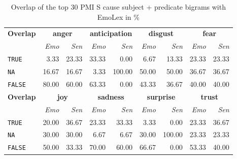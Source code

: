 \begin{table}[]
\centering
\begin{tabular}{l|rr|rr|rr|rr}
{\bf Overlap} & \multicolumn{2}{c}{{\bf anger}} & \multicolumn{2}{c}{{\bf anticipation}} & \multicolumn{2}{c}{{\bf disgust}} & \multicolumn{2}{c}{{\bf fear}} \\\
 & {\it Emo} & {\it Sen} & {\it Emo} & {\it Sen} & {\it Emo} & {\it Sen} & {\it Emo} & {\it Sen} \\\hline
\texttt{TRUE} & 3.33 & 23.33 & 33.33 & 0.00 & 6.67 & 13.33 & 23.33 & 23.33 \\
\texttt{NA} & 16.67 & 16.67 & 3.33 & 100.00 & 50.00 & 50.00 & 36.67 & 36.67 \\
\texttt{FALSE} & 80.00 & 60.00 & 63.33 & 0.00 & 43.33 & 36.67 & 40.00 & 40.00 \\\hline
{\bf Overlap} & \multicolumn{2}{c}{{\bf joy}} & \multicolumn{2}{c}{{\bf sadness}} & \multicolumn{2}{c}{{\bf surprise}} & \multicolumn{2}{c}{{\bf trust}} \\
 & {\it Emo} & {\it Sen} & {\it Emo} & {\it Sen} & {\it Emo} & {\it Sen} & {\it Emo} & {\it Sen} \\\hline
\texttt{TRUE} & 20.00 & 36.67 & 23.33 & 33.33 & 3.33 & 0.00 & 23.33 & 36.67 \\
\texttt{NA} & 30.00 & 30.00 & 6.67 & 6.67 & 30.00 & 100.00 & 23.33 & 23.33 \\
\texttt{FALSE} & 50.00 & 33.33 & 70.00 & 60.00 & 66.67 & 0.00 & 53.33 & 40.00
\end{tabular}
\caption{Overlap of the top 30 PMI S cause subject + predicate bigrams with EmoLex in \%}
\label{tab:s-cause-subj-pred-nrc-overlap}
\end{table}


